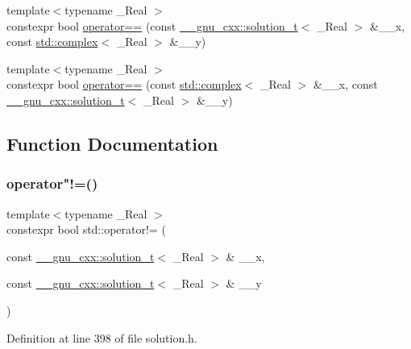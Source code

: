 \begin{DoxyCompactItemize}
\item 
{\footnotesize template$<$typename \+\_\+\+Real $>$ }\\constexpr bool \hyperlink{namespacestd_a7c9ad0c2dd7b387d13d1c5efead8a864}{operator==} (const \hyperlink{namespace____gnu__cxx_ae20ea642de50eb361074c62676b0159c}{\+\_\+\+\_\+gnu\+\_\+cxx\+::solution\+\_\+t}$<$ \+\_\+\+Real $>$ \&\+\_\+\+\_\+x, const \hyperlink{classstd_1_1complex}{std\+::complex}$<$ \+\_\+\+Real $>$ \&\+\_\+\+\_\+y)
\item 
{\footnotesize template$<$typename \+\_\+\+Real $>$ }\\constexpr bool \hyperlink{namespacestd_a79924b566476ed02b0e085744a838d4c}{operator==} (const \hyperlink{classstd_1_1complex}{std\+::complex}$<$ \+\_\+\+Real $>$ \&\+\_\+\+\_\+x, const \hyperlink{namespace____gnu__cxx_ae20ea642de50eb361074c62676b0159c}{\+\_\+\+\_\+gnu\+\_\+cxx\+::solution\+\_\+t}$<$ \+\_\+\+Real $>$ \&\+\_\+\+\_\+y)
\end{DoxyCompactItemize}


\subsection{Function Documentation}
\mbox{\label{namespacestd_a0f89c0cd89caea7c7413c22c4c7e21f9}} 
\subsubsection{\texorpdfstring{operator"!=()}{operator!=()}\hspace{0.1cm}{\footnotesize\ttfamily [1/5]}}
{\footnotesize\ttfamily template$<$typename \+\_\+\+Real $>$ \\
constexpr bool std\+::operator!= (\begin{DoxyParamCaption}\item[{const \hyperlink{namespace____gnu__cxx_ae20ea642de50eb361074c62676b0159c}{\+\_\+\+\_\+gnu\+\_\+cxx\+::solution\+\_\+t}$<$ \+\_\+\+Real $>$ \&}]{\+\_\+\+\_\+x,  }\item[{const \hyperlink{namespace____gnu__cxx_ae20ea642de50eb361074c62676b0159c}{\+\_\+\+\_\+gnu\+\_\+cxx\+::solution\+\_\+t}$<$ \+\_\+\+Real $>$ \&}]{\+\_\+\+\_\+y }\end{DoxyParamCaption})}



Definition at line 398 of file solution.\+h.


